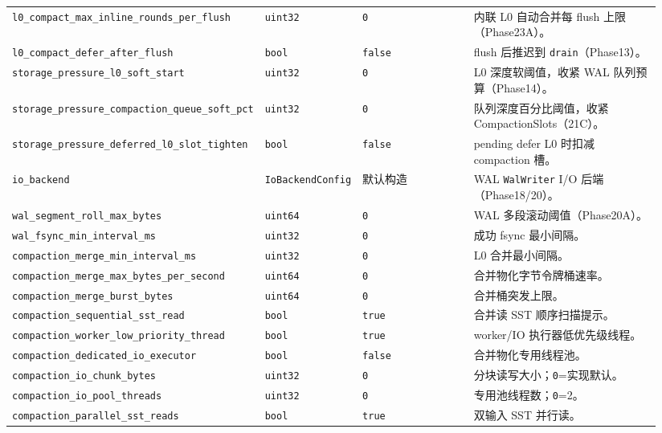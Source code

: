 {\begin{longtable}{@{}p{0.34\linewidth}p{0.12\linewidth}p{0.18\linewidth}p{0.30\linewidth}@{}}
\texttt{l0\_compact\_max\_inline\_rounds\_per\_flush} & \texttt{uint32} & \texttt{0} & 内联 L0 自动合并每 flush 上限（Phase23A）。 \\
\texttt{l0\_compact\_defer\_after\_flush} & \texttt{bool} & \texttt{false} & flush 后推迟到 \texttt{drain}（Phase13）。 \\
\texttt{storage\_pressure\_l0\_soft\_start} & \texttt{uint32} & \texttt{0} & L0 深度软阈值，收紧 WAL 队列预算（Phase14）。 \\
\texttt{storage\_pressure\_compaction\_queue\_soft\_pct} & \texttt{uint32} & \texttt{0} & 队列深度百分比阈值，收紧 CompactionSlots（21C）。 \\
\texttt{storage\_pressure\_deferred\_l0\_slot\_tighten} & \texttt{bool} & \texttt{false} & pending defer L0 时扣减 compaction 槽。 \\
\texttt{io\_backend} & \texttt{IoBackendConfig} & 默认构造 & WAL \texttt{WalWriter} I/O 后端（Phase18/20）。 \\
\texttt{wal\_segment\_roll\_max\_bytes} & \texttt{uint64} & \texttt{0} & WAL 多段滚动阈值（Phase20A）。 \\
\texttt{wal\_fsync\_min\_interval\_ms} & \texttt{uint32} & \texttt{0} & 成功 fsync 最小间隔。 \\
\texttt{compaction\_merge\_min\_interval\_ms} & \texttt{uint32} & \texttt{0} & L0 合并最小间隔。 \\
\texttt{compaction\_merge\_max\_bytes\_per\_second} & \texttt{uint64} & \texttt{0} & 合并物化字节令牌桶速率。 \\
\texttt{compaction\_merge\_burst\_bytes} & \texttt{uint64} & \texttt{0} & 合并桶突发上限。 \\
\texttt{compaction\_sequential\_sst\_read} & \texttt{bool} & \texttt{true} & 合并读 SST 顺序扫描提示。 \\
\texttt{compaction\_worker\_low\_priority\_thread} & \texttt{bool} & \texttt{true} & worker/IO 执行器低优先级线程。 \\
\texttt{compaction\_dedicated\_io\_executor} & \texttt{bool} & \texttt{false} & 合并物化专用线程池。 \\
\texttt{compaction\_io\_chunk\_bytes} & \texttt{uint32} & \texttt{0} & 分块读写大小；\texttt{0}=实现默认。 \\
\texttt{compaction\_io\_pool\_threads} & \texttt{uint32} & \texttt{0} & 专用池线程数；\texttt{0}=2。 \\
\texttt{compaction\_parallel\_sst\_reads} & \texttt{bool} & \texttt{true} & 双输入 SST 并行读。 \\

\end{longtable}}

